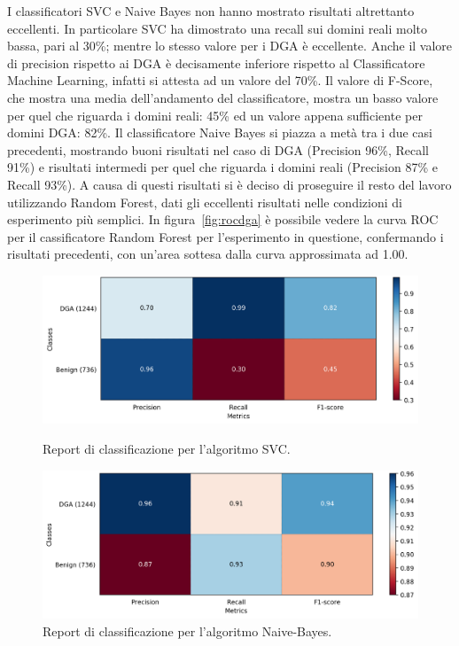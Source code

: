 I classificatori SVC e Naive Bayes non hanno mostrato risultati altrettanto eccellenti. In particolare SVC ha dimostrato una recall sui domini reali molto bassa, pari al 30\%; mentre lo stesso valore per i DGA è eccellente. Anche il valore di precision rispetto ai DGA è decisamente inferiore rispetto al Classificatore Machine Learning, infatti si attesta ad un valore del 70\%. Il valore di F-Score, che mostra una media dell'andamento del classificatore, mostra un basso valore per quel che riguarda i domini reali: 45\% ed un valore appena sufficiente per domini DGA: 82\%.
Il classificatore Naive Bayes si piazza a metà tra i due casi precedenti, mostrando buoni risultati nel caso di DGA (Precision 96\%, Recall 91\%) e risultati intermedi per quel che riguarda i domini reali (Precision 87\% e Recall 93\%). A causa di questi risultati si è deciso di proseguire il resto del lavoro utilizzando Random Forest, dati gli eccellenti risultati nelle condizioni di esperimento più semplici. 
In figura~\ref{fig:rocdga} è possibile vedere la curva ROC per il cassificatore Random Forest per l'esperimento in questione, confermando i risultati precedenti, con un'area sottesa dalla curva approssimata ad 1.00.

\begin{figure}[!bp]
  	\centering
    \includegraphics[width=\columnwidth]{figures/report_SVC.png}
    \caption{Report di classificazione per l'algoritmo SVC.\label{fig:repsvc}}
	\hfill
	\vspace{3cm}
	\centering
    \includegraphics[width=\columnwidth]{figures/report_GaussianNB.png}
    \caption{Report di classificazione per l'algoritmo Naive-Bayes.\label{fig:repgnb}}
\end{figure}

